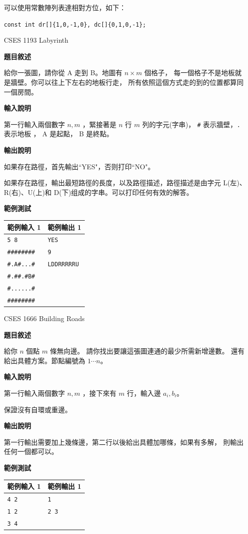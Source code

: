     \begin{tip}
        可以使用常數陣列表達相對方位，如下：

        \verb|const int dr[]{1,0,-1,0}, dc[]{0,1,0,-1};|
    \end{tip}

    \problem CSES 1193 Labyrinth

    \textbf{題目敘述}

    給你一張圖，請你從 A 走到 B。地圖有 $n \times m$ 個格子，
    每一個格子不是地板就是牆壁。你可以往上下左右的地板行走，
    所有依照這個方式走的到的位置都算同一個房間。

    \textbf{輸入說明}

    第一行輸入兩個數字 $n,m$ ，緊接著是 $n$ 行 $m$ 列的字元(字串)，
     \verb|#| 表示牆壁，\verb|.| 表示地板 ， A 是起點， B 是終點。
    
    \textbf{輸出說明}

    如果存在路徑，首先輸出``YES"，否则打印``NO"。

    如果存在路徑，輸出最短路徑的長度，以及路徑描述，路徑描述是由字元 L(左)、
    R(右)、U(上)和 D(下)组成的字串。可以打印任何有效的解答。

    \textbf{範例測試}

    \begin{tabular}{|m{7cm}|m{7cm}|}
        \hline
        範例輸入 1 & 範例輸出 1 \\
        \hline
        \verb|5 8|  & \verb|YES| \\
        \verb|########|  & \verb|9| \\
        \verb|#.A#...#|  & \verb|LDDRRRRRU| \\
        \verb|#.##.#B#|  & \\
        \verb|#......#|  & \\
        \verb|########| & \\
        \hline
    \end{tabular}

    \problem CSES 1666 Building Roads

    \textbf{題目敘述}

    給你 $n$ 個點 $m$ 條無向邊。
    請你找出要讓這張圖連通的最少所需新增邊數。
    還有給出具體方案。節點編號為 $1 \cdots n$。

    \textbf{輸入說明}

    第一行輸入兩個數字 $n,m$ ，接下來有 $m$ 行，輸入邊 $a_i,b_i$。
    
    保證沒有自環或重邊。

    \textbf{輸出說明}

    第一行輸出需要加上幾條邊，第二行以後給出具體加哪條，如果有多解，
    則輸出任何一個都可以。

    \textbf{範例測試}

    \begin{tabular}{|m{7cm}|m{7cm}|}
        \hline
        範例輸入 1 & 範例輸出 1 \\
        \hline
        \verb|4 2|  & \verb|1| \\
        \verb|1 2|  & \verb|2 3| \\
        \verb|3 4|  &\\
        \hline
    \end{tabular}
    